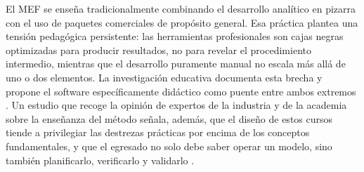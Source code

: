 El MEF se enseña tradicionalmente combinando el desarrollo analítico en pizarra con el uso de paquetes comerciales de propósito general. Esa práctica plantea una tensión pedagógica persistente: las herramientas profesionales son cajas negras optimizadas para producir resultados, no para revelar el procedimiento intermedio, mientras que el desarrollo puramente manual no escala más allá de uno o dos elementos. La investigación educativa documenta esta brecha y propone el software específicamente didáctico como puente entre ambos extremos \autocite{bishay2020teaching,lee2015interactive,perezsantiago2023fem}. Un estudio que recoge la opinión de expertos de la industria y de la academia sobre la enseñanza del método señala, además, que el diseño de estos cursos tiende a privilegiar las destrezas prácticas por encima de los conceptos fundamentales, y que el egresado no solo debe saber operar un modelo, sino también planificarlo, verificarlo y validarlo \autocite[p.~1159]{perezsantiago2023fem}.

